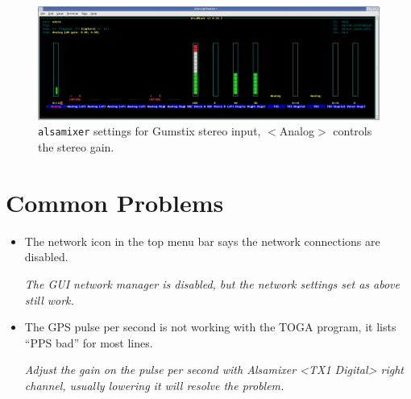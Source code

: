 \begin{figure}[ht!]
   \centering
   \includegraphics[scale=.25]{Appendix/Figures/gumstixmixer.png}
   \caption{\texttt{alsamixer} settings for Gumstix stereo input, $<$Analog$>$ controls the stereo gain.}
   \label{app:gumstix:fig:alsa}
\end{figure}

\section{Common Problems}

\begin{itemize}
\item The network icon in the top menu bar says the network connections are disabled.

\emph{The GUI network manager is disabled, but the network settings set as above still work.}

\item The GPS pulse per second is not working with the TOGA program, it lists ``PPS bad'' for most lines.

\emph{Adjust the gain on the pulse per second with Alsamixer <TX1 Digital> right channel, usually lowering it will resolve the problem.}

\end{itemize}


